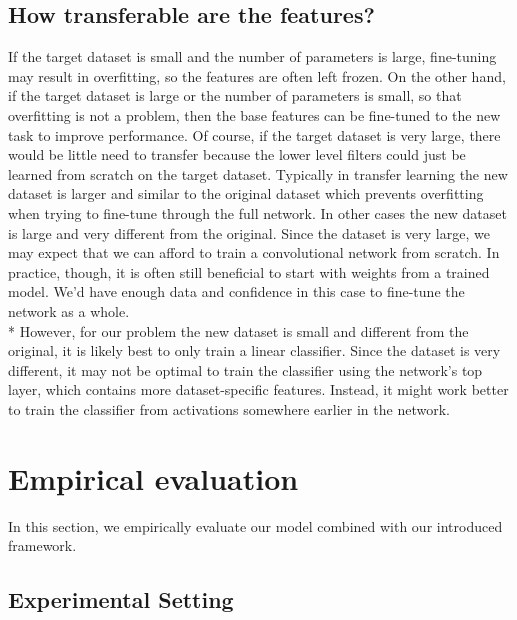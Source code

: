 \documentclass[11pt]{article}
\begin{document}
\subsection{How transferable are the features?}
If the target dataset is small and the number of parameters is large, fine-tuning may result in overfitting, so the features are often left frozen. On the other hand, if the target dataset is large or the number of parameters is small, so that overfitting is not a problem, then the base features can be fine-tuned to the new task to improve performance. Of course, if the target dataset is very large, there would be little need to transfer because the lower level filters could just be learned from scratch on the target dataset. \cite{yosinski2014transferable}
Typically in transfer learning the new dataset is larger and similar to the original dataset which prevents overfitting when trying to fine-tune through the full network.
In other cases the new dataset is large and very different from the original. Since the dataset is very large, we  may expect that we can afford to train a convolutional network from scratch. In practice, though, it is often still beneficial to start with weights from a trained model. We'd have enough data and confidence in this case to fine-tune the network as a whole.\\* However, for our problem the new dataset is small and different from the original, it is likely best to only train a linear classifier. Since the dataset is very different, it may not be optimal to train the classifier using the network's top layer, which contains more dataset-specific features. Instead, it might work better to train the classifier from activations somewhere earlier in the network.



\section{Empirical evaluation}
In this section, we empirically evaluate our model combined with our introduced framework.

\subsection{Experimental Setting}
\end{document}
